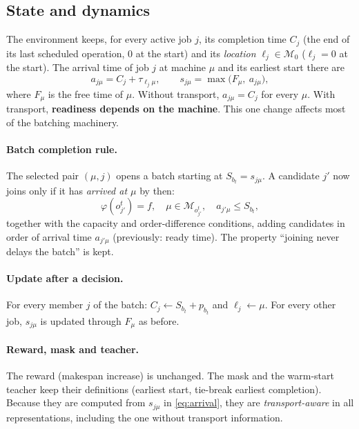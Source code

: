 \documentclass[11pt,a4paper]{article}
\newcommand{\Mset}{\mathcal{M}}
\newcommand{\loc}{\ell}
\begin{document}
\subsection{State and dynamics}
The environment keeps, for every active job $j$, its completion time $C_j$ (the
end of its last scheduled operation, $0$ at the start) and its \emph{location}
$\loc_j\in\Mset_0$ ($\loc_j=0$ at the start). The arrival time of job $j$ at
machine $\mu$ and its earliest start there are
\begin{equation}
  a_{j\mu}=C_j+\tau_{\loc_j\mu},\qquad
  s_{j\mu}=\max\bigl(F_\mu,\ a_{j\mu}\bigr),
  \label{eq:arrival}
\end{equation}
where $F_\mu$ is the free time of $\mu$. Without transport, $a_{j\mu}=C_j$ for
every $\mu$. With transport, \textbf{readiness depends on the machine}. This one
change affects most of the batching machinery.

\paragraph{Batch completion rule.} The selected pair $(\mu,j)$ opens a batch
starting at $S_{b_t}=s_{j\mu}$. A candidate $j'$ now joins only if it has
\emph{arrived at $\mu$} by then:
\begin{equation}
  \varphi(o_{j'}^t)=f,\quad \mu\in\Mset_{o_{j'}^t},\quad
  a_{j'\mu}\le S_{b_t},
\end{equation}
together with the capacity and order-difference conditions, adding candidates in
order of arrival time $a_{j'\mu}$ (previously: ready time). The property
``joining never delays the batch'' is kept.

\paragraph{Update after a decision.} For every member $j$ of the batch:
$C_j\leftarrow S_{b_t}+p_{b_t}$ and $\loc_j\leftarrow\mu$. For every other job,
$s_{j\mu}$ is updated through $F_\mu$ as before.

\paragraph{Reward, mask and teacher.} The reward (makespan increase) is
unchanged. The mask and the warm-start teacher keep their definitions (earliest
start, tie-break earliest completion). Because they are computed from
$s_{j\mu}$ in \eqref{eq:arrival}, they are \emph{transport-aware} in all
representations, including the one without transport information.
\end{document}
